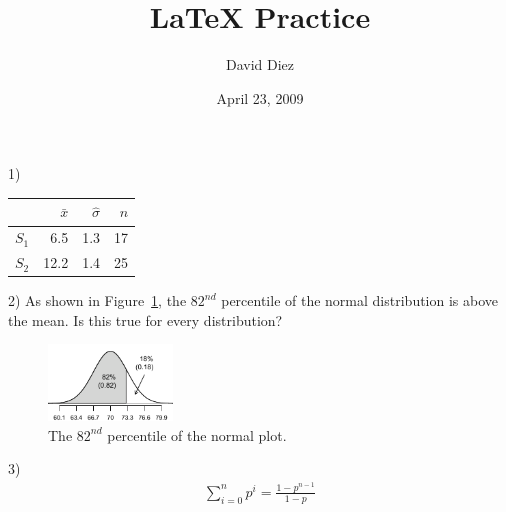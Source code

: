 \documentclass[11pt]{article}
\title{LaTeX Practice}
\author{David Diez}
\date{April 23, 2009}                                           %
\begin{document}
\maketitle
1) 
\begin{center}
\begin{tabular}{l rrr}
\hline
	& $\bar{x}$ & $\hat{\sigma}$ & $n$ \\
\hline
$S_1$ & 6.5	&	1.3			& 17 \\
$S_2$ & 12.2	&	1.4			& 25 \\
\hline
\end{tabular}
\end{center}

2) As shown in Figure~\ref{lower82}, the $82^{nd}$ percentile of the normal distribution is above the mean. Is this true for every distribution?
\begin{figure}[htbp]
   \centering
   \includegraphics[height=0.8in]{normalPlots/lower82/lower82}
   \caption{The $82^{nd}$ percentile of the normal plot.}
   \label{lower82}
\end{figure}

3)
\begin{eqnarray*}
\sum_{i=0}^n p^{i} = \frac{1-p^{n-1}}{1-p}
\end{eqnarray*}
\end{document}
